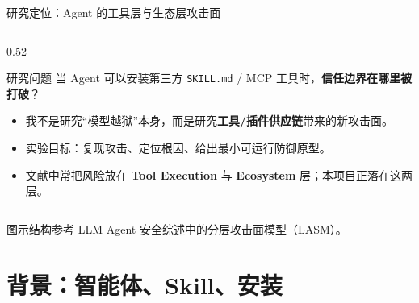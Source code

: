\documentclass[aspectratio=169,10pt,fontset=fandol]{ctexbeamer}
\begin{document}
\begin{frame}{研究定位：Agent 的工具层与生态层攻击面}
\begin{columns}
\begin{column}{0.52\textwidth}
  \begin{block}{研究问题}
    当 Agent 可以安装第三方 \texttt{SKILL.md} / MCP 工具时，\textbf{信任边界在哪里被打破}？
  \end{block}
  \begin{itemize}[<+->]
    \item 我不是研究“模型越狱”本身，而是研究\textbf{工具/插件供应链}带来的新攻击面。
    \item 实验目标：复现攻击、定位根因、给出最小可运行防御原型。
    \item 文献中常把风险放在 \textbf{Tool Execution} 与 \textbf{Ecosystem} 层；本项目正落在这两层。
  \end{itemize}
\end{column}
\end{columns}
\vfill\footnotesize 图示结构参考 LLM Agent 安全综述中的分层攻击面模型（LASM）。
\end{frame}

\section{背景：智能体、Skill、安装}
\end{document}
